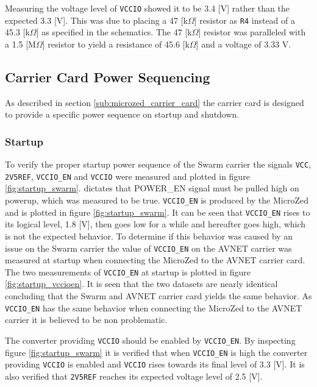 Measuring the voltage level of \texttt{VCCIO} showed it to be 3.4 [V] rather than the expected 3.3 [V].
This was due to placing a 47 [k$\Omega$] resistor as \texttt{R4} instead of a 45.3 [k$\Omega$] as specified in the schematics.
The 47 [k$\Omega$] resistor was paralleled with a 1.5 [M$\Omega$] resistor to yield a resistance of 45.6 [k$\Omega$] and a voltage of 3.33 V.

\subsection{Carrier Card Power Sequencing}
As described in section \ref{sub:microzed_carrier_card} the carrier card is designed to provide a specific power sequence on startup and shutdown.

\subsubsection*{Startup}
To verify the proper startup power sequence of the Swarm carrier the signals \texttt{VCC}, \texttt{2V5REF}, \texttt{VCCIO\_EN} and \texttt{VCCIO} were measured and plotted in figure \ref{fig:startup_swarm}.
\cite{design_carrier} dictates that POWER\_EN signal must be pulled high on powerup, which was measured to be true.
\texttt{VCCIO\_EN} is produced by the MicroZed and is plotted in figure \ref{fig:startup_swarm}. 
It can be seen that \texttt{VCCIO\_EN} rises to its logical level, 1.8 [V], then goes low for a while and hereafter goes high, which is not the expected behavior.
To determine if this behavior was caused by an issue on the Swarm carrier the value of \texttt{VCCIO\_EN} on the AVNET carrier was measured at startup when connecting the MicroZed to the AVNET carrier card.
The two measurements of \texttt{VCCIO\_EN} at startup is plotted in figure \ref{fig:startup_vccioen}.
It is seen that the two datasets are nearly identical concluding that the Swarm and AVNET carrier card yields the same behavior.
As \texttt{VCCIO\_EN} has the same behavior when connecting the MicroZed to the AVNET carrier it is believed to be non problematic.

The converter providing \texttt{VCCIO} should be enabled by \texttt{VCCIO\_EN}.
By inspecting figure \ref{fig:startup_swarm} it is verified that when \texttt{VCCIO\_EN} is high the converter providing \texttt{VCCIO} is enabled and  \texttt{VCCIO} rises towards its final level of 3.3 [V].
It is also verified that \texttt{2V5REF} reaches its expected voltage level of 2.5 [V].

